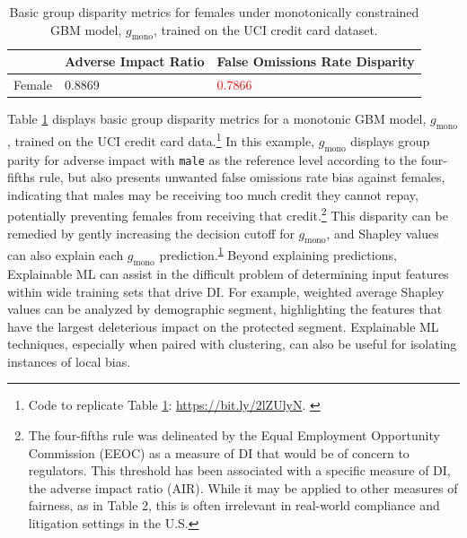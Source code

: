 \documentclass{article}
\begin{document}
\begin{table}
  	\caption{Basic group disparity metrics for females under monotonically constrained GBM model, $g_{\text{mono}}$, trained on the UCI credit card dataset.\\}
  	\label{tab:dia}
  	\centering
  	\begin{tabular}{lll}
    	\toprule
    	& Adverse Impact Ratio & False Omissions Rate Disparity \\
    	\midrule
		Female & 0.8869 & \textcolor{red}{0.7866} \\
    	\bottomrule
  \end{tabular}
\end{table}

Table \ref{tab:dia} displays basic group disparity metrics for a monotonic GBM model, $g_{\text{mono}}$, trained on the UCI credit card data.\footnote{\scriptsize{Code to replicate Table \ref{tab:dia}:  \url{https://bit.ly/2lZUlyN}.} \label{fn:dia}} In this example, $g_{\text{mono}}$ displays group parity for adverse impact with \texttt{male} as the reference level according to the four-fifths rule, but also presents unwanted false omissions rate bias against females, indicating that males may be receiving too much credit they cannot repay, potentially preventing females from receiving that credit.\footnote{\scriptsize{The four-fifths rule was delineated by the Equal Employment Opportunity Commission (EEOC) as a measure of DI that would be of concern to regulators. This threshold has been associated with a specific measure of DI, the adverse impact ratio (AIR). While it may be applied to other measures of fairness, as in Table 2, this is often irrelevant in real-world compliance and litigation settings in the U.S.}} This disparity can be remedied by gently increasing the decision cutoff for $g_{\text{mono}}$, and Shapley values can also explain each $g_{\text{mono}}$ prediction.\textsuperscript{\ref{fn:dia}} Beyond explaining predictions, Explainable ML can assist in the difficult problem of determining input features within wide training sets that drive DI. For example, weighted average Shapley values can be analyzed by demographic segment, highlighting the features that have the largest deleterious impact on the protected segment. Explainable ML techniques, especially when paired with clustering, can also be useful for isolating instances of local bias.
\end{document}
